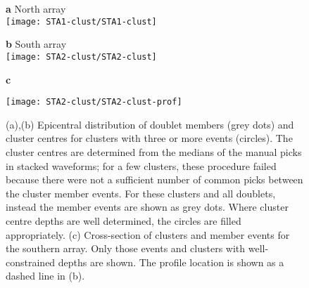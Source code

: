 \documentclass[reviewcopy]{elsart}
\renewcommand{\includegraphics}[2][]{\fbox{#2}}
\begin{document}
\begin{figure}
\parbox{0.5\textwidth}{{\sf \bf a} North array \\
\texttt{[image: STA1-clust/STA1-clust]}}
\parbox{0.5\textwidth}{{\sf \bf b} South array \\
\texttt{[image: STA2-clust/STA2-clust]}}

\vspace{\baselineskip}
{\sf \bf c}

\texttt{[image: STA2-clust/STA2-clust-prof]}

\caption{(a),(b) Epicentral distribution of doublet members (grey
  dots) and cluster centres
  for clusters with three or more events (circles). The cluster centres
  are determined from the medians of the manual picks in stacked
  waveforms; for a few clusters, these procedure failed because there
  were not a sufficient number of common picks between the cluster
  member events.   For these clusters and all doublets, instead the
  member events are shown as grey dots.  Where cluster centre
  depths are well determined, the circles are filled appropriately.
 (c) Cross-section of clusters and member events for the southern array. Only those events and
 clusters with well-constrained depths are shown. The profile location
is shown as a dashed line in (b).}
\label{fig:clust-location}
\end{figure}
\end{document}
